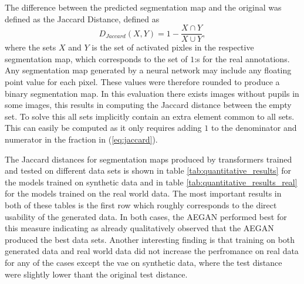 The difference between the predicted segmentation map and the original was defined as the Jaccard Distance, defined as
\begin{equation}
    D_{Jaccard}(X, Y) = 1 - \frac{X \cap Y}{X \cup Y},
    \label{eq:jaccard}
\end{equation}
where the sets $X$ and $Y$ is the set of activated pixles in the respective segmentation map, which corresponds to the set of $1$:s for the real annotations. Any segmentation map generated by a neural network may include any floating point value for each pixel. These values were therefore rounded to produce a binary segmentation map. In this evaluation there exists images without pupils in some images, this results in computing the Jaccard distance between the empty set. To solve this all sets implicitly contain an extra element common to all sets. This can easily be computed as it only requires adding $1$ to the denominator and numerator in the fraction in (\ref{eq:jaccard}).

The Jaccard distances for segmentation maps produced by transformers trained and tested on different data sets is shown in table \ref{tab:quantitative_results} for the models trained on synthetic data and in table \ref{tab:quantitative_results_real} for the models trained on the real world data. The most important results in both of these tables is the first row which roughly corresponds to the direct usability of the generated data. In both cases, the AEGAN performed best for this measure indicating as already qualitatively observed that the AEGAN produced the best data sets. Another interesting finding is that training on both generated data and real world data did not increase the perfromance on real data for any of the cases except the \acrshort{vae} on synthetic data, where the test distance were slightly lower thant the original test distance.










